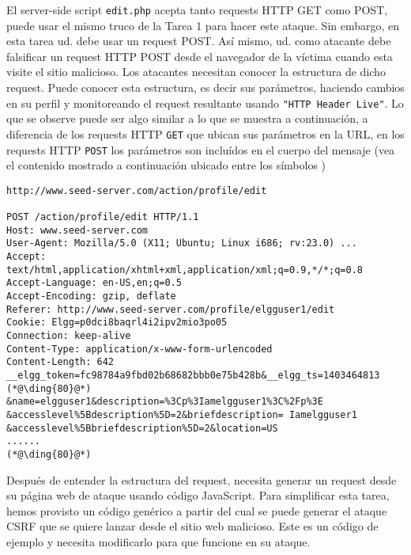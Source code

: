 El server-side script {\tt edit.php} acepta tanto requests HTTP GET como POST, puede usar el mismo truco de la Tarea 1 para hacer este ataque.
Sin embargo, en esta tarea ud. debe usar un request POST.
Así mismo, ud. como atacante debe falsificar un request HTTP POST desde el navegador de la víctima cuando esta visite el sitio malicioso.
Los atacantes necesitan conocer la estructura de dicho request. Puede conocer esta estructura, es decir sus parámetros, haciendo cambios en su perfil y monitoreando el request resultante usando \texttt{"HTTP Header Live"}.
Lo que se observe puede ser algo similar a lo que se muestra a continuación, a diferencia de los requests HTTP {\tt GET} que ubican sus parámetros en la URL, en los requests HTTP {\tt POST} los parámetros son incluídos en el cuerpo del mensaje (vea el contenido mostrado a continuación ubicado entre los símbolos )

\begin{lstlisting}
http://www.seed-server.com/action/profile/edit

POST /action/profile/edit HTTP/1.1
Host: www.seed-server.com
User-Agent: Mozilla/5.0 (X11; Ubuntu; Linux i686; rv:23.0) ...
Accept: text/html,application/xhtml+xml,application/xml;q=0.9,*/*;q=0.8
Accept-Language: en-US,en;q=0.5
Accept-Encoding: gzip, deflate
Referer: http://www.seed-server.com/profile/elgguser1/edit
Cookie: Elgg=p0dci8baqrl4i2ipv2mio3po05
Connection: keep-alive
Content-Type: application/x-www-form-urlencoded
Content-Length: 642
__elgg_token=fc98784a9fbd02b68682bbb0e75b428b&__elgg_ts=1403464813  (*@\ding{80}@*) 
&name=elgguser1&description=%3Cp%3Iamelgguser1%3C%2Fp%3E
&accesslevel%5Bdescription%5D=2&briefdescription= Iamelgguser1
&accesslevel%5Bbriefdescription%5D=2&location=US
......                                                              (*@\ding{80}@*)
\end{lstlisting}

Después de entender la estructura del request, necesita generar un request desde su página web de ataque usando código JavaScript.
Para simplificar esta tarea, hemos provisto un código genérico a partir del cual se puede generar el ataque CSRF que se quiere lanzar desde el sitio web malicioso. Este es un código de ejemplo y necesita modificarlo para que funcione en su ataque.


